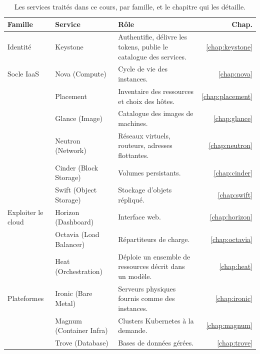 \begin{table}[!ht]
\centering
\renewcommand{\arraystretch}{1.2}
\begin{tabular}{@{}>{\raggedright\arraybackslash}p{2.9cm}>{\raggedright\arraybackslash}p{3.3cm}>{\raggedright\arraybackslash}p{7.8cm}r@{}}
\toprule
\textbf{Famille} & \textbf{Service} & \textbf{Rôle} & \textbf{Chap.} \\
\midrule
Identité & Keystone & Authentifie, délivre les tokens, publie le catalogue des services. & \ref{chap:keystone} \\
\midrule
Socle IaaS & Nova (Compute) & Cycle de vie des instances. & \ref{chap:nova} \\
 & Placement & Inventaire des ressources et choix des hôtes. & \ref{chap:placement} \\
 & Glance (Image) & Catalogue des images de machines. & \ref{chap:glance} \\
 & Neutron (Network) & Réseaux virtuels, routeurs, adresses flottantes. & \ref{chap:neutron} \\
 & Cinder (Block Storage) & Volumes persistants. & \ref{chap:cinder} \\
 & Swift (Object Storage) & Stockage d'objets répliqué. & \ref{chap:swift} \\
\midrule
Exploiter le cloud & Horizon (Dashboard) & Interface web. & \ref{chap:horizon} \\
 & Octavia (Load Balancer) & Répartiteurs de charge. & \ref{chap:octavia} \\
 & Heat (Orchestration) & Déploie un ensemble de ressources décrit dans un modèle. & \ref{chap:heat} \\
\midrule
Plateformes & Ironic (Bare Metal) & Serveurs physiques fournis comme des instances. & \ref{chap:ironic} \\
 & Magnum (Container Infra) & Clusters Kubernetes à la demande. & \ref{chap:magnum} \\
 & Trove (Database) & Bases de données gérées. & \ref{chap:trove} \\
\bottomrule
\end{tabular}
\caption{Les services traités dans ce cours, par famille, et le chapitre qui les détaille.}
\label{tab:pres-services}
\end{table}

